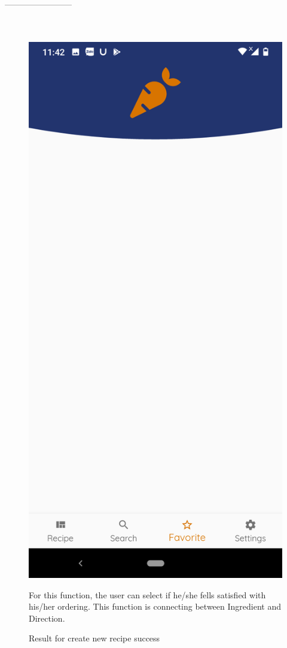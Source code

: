 \documentclass{article}
\begin{document}
             ------------------------\\ \\ \\
        \begin{figure}[h!]
        \centering
        \includegraphics[scale=0.1]{Images/Favorite.jpg}
        \caption{Result for create new recipe success}
        For this function, the user can select if he/she fells satisfied with his/her ordering. This function is connecting between Ingredient and Direction. 
        \label{fig:cookingbook}
        \end{figure}
\end{document}
